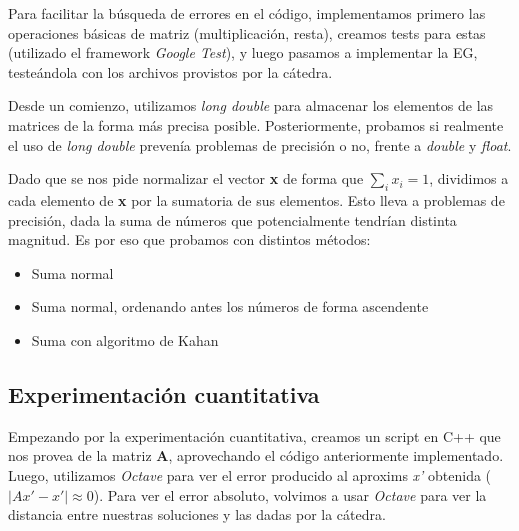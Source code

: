 Para facilitar la búsqueda de errores en el código, implementamos primero las
operaciones básicas de matriz (multiplicación, resta), creamos tests para estas
(utilizado el framework \textit{Google Test}), y luego pasamos a implementar
la EG, testeándola con los archivos provistos por la cátedra.

Desde un comienzo, utilizamos \textit{long double} para almacenar los elementos
de las matrices de la forma más precisa posible. Posteriormente, probamos
si realmente el uso de \textit{long double} prevenía problemas de precisión
o no, frente a \textit{double} y \textit{float}.

Dado que se nos pide normalizar el vector \textbf{x} de forma que
$\sum_{i} \textit{x}_i = 1$, dividimos a cada elemento de \textbf{x} por la
sumatoria de sus elementos. Esto lleva a problemas de precisión, dada la suma
de números que potencialmente tendrían distinta magnitud. Es por eso que
probamos con distintos métodos:
\begin{itemize}
\item Suma normal
\item Suma normal, ordenando antes los números de forma ascendente
\item Suma con algoritmo de Kahan
\end{itemize}


\subsection{Experimentación cuantitativa}
Empezando por la experimentación cuantitativa, creamos un script en C++ que nos
provea de la matriz \textbf{A}, aprovechando el código anteriormente implementado.
Luego, utilizamos \textit{Octave} para ver el error producido al aproxims
\textit{x'} obtenida ($|Ax' - x'| \approx 0$). Para ver el error absoluto,
volvimos a usar \textit{Octave} para ver la distancia entre nuestras soluciones
y las dadas por la cátedra.

